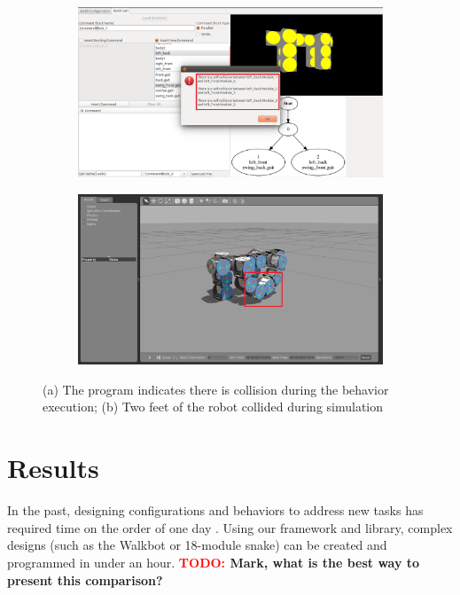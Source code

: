 \documentclass[conference]{IEEEtran}
\theoremstyle{definition}
\newcommand{\TODO}[1]{ {\bf \textcolor{red}{TODO:} #1 }}
\begin{document}
\begin{figure}
\begin{center}
        \begin{subfigure}[b]{0.48\columnwidth}
                \includegraphics[width=\textwidth]{images/designer_gait_collision.png}
                \caption{}
                \label{fig:gait_collision}
           \end{subfigure}
        \begin{subfigure}[b]{0.48\columnwidth}
                \includegraphics[width=\textwidth]{images/gazebo_gait_collision.png}
                \caption{}
                \label{fig:gait_collision2}
        \end{subfigure}
\end{center}
\caption{(a) The program indicates there is collision during the behavior execution; (b) Two feet of  the robot collided during simulation}
\label{fig:gait_unstable}
\end{figure}


\section{Results}
In the past, designing configurations and behaviors to address new tasks has required
time on the order of one day \cite{sastra2011using}. Using our framework and library,
complex designs (such as the Walkbot or 18-module snake) can be created and programmed
in under an hour. \TODO{Mark, what is the best
way to present this comparison?} 
\end{document}
